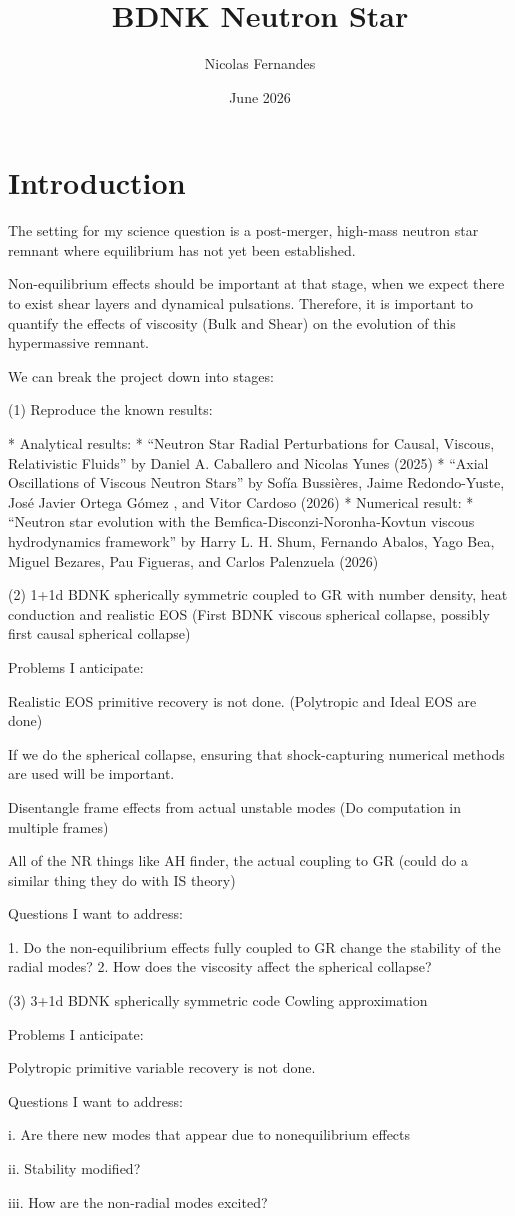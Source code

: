 \documentclass{article}
\title{BDNK Neutron Star}
\author{Nicolas Fernandes}
\date{June 2026}
\begin{document}
\maketitle

\section{Introduction}

The setting for my science question is a post-merger, high-mass neutron star remnant where equilibrium has not yet been established. 

Non-equilibrium effects should be important at that stage, when we expect there to exist shear layers and dynamical pulsations. Therefore, it is important to quantify the effects of viscosity (Bulk and Shear) on the evolution of this hypermassive remnant.

We can break the project down into stages:

(1) Reproduce the known results:

* Analytical results:
  * “Neutron Star Radial Perturbations for Causal, Viscous, Relativistic Fluids” by Daniel A. Caballero and Nicolas Yunes (2025)
  * “Axial Oscillations of Viscous Neutron Stars” by Sofía Bussières, Jaime Redondo-Yuste, José Javier Ortega Gómez , and Vitor Cardoso (2026)
* Numerical result:
  * “Neutron star evolution with the Bemfica-Disconzi-Noronha-Kovtun viscous hydrodynamics framework” by Harry L. H. Shum, Fernando Abalos, Yago Bea, Miguel Bezares, Pau Figueras, and Carlos Palenzuela (2026)

(2) 1+1d BDNK spherically symmetric coupled to GR with number density, heat conduction and realistic EOS (First BDNK viscous spherical collapse, possibly first causal spherical collapse)

  Problems I anticipate:

    Realistic EOS primitive recovery is not done. (Polytropic and Ideal EOS are done)          

    If we do the spherical collapse, ensuring that shock-capturing numerical methods are used will be important.

    Disentangle frame effects from actual unstable modes (Do computation in multiple frames)

    All of the NR things like AH finder, the actual coupling to GR (could do a similar thing they do with IS theory)

  Questions I want to address: 

    1. Do the non-equilibrium effects fully coupled to GR change the stability of the radial modes?
    2. How does the viscosity affect the spherical collapse? 

(3) 3+1d BDNK spherically symmetric code Cowling approximation 

  Problems I anticipate: 

    Polytropic primitive variable recovery is not done.

  Questions I want to address:

    i.  Are there new modes that appear due to nonequilibrium effects

    ii. Stability modified?

    iii. How are the non-radial modes excited?
\end{document}
